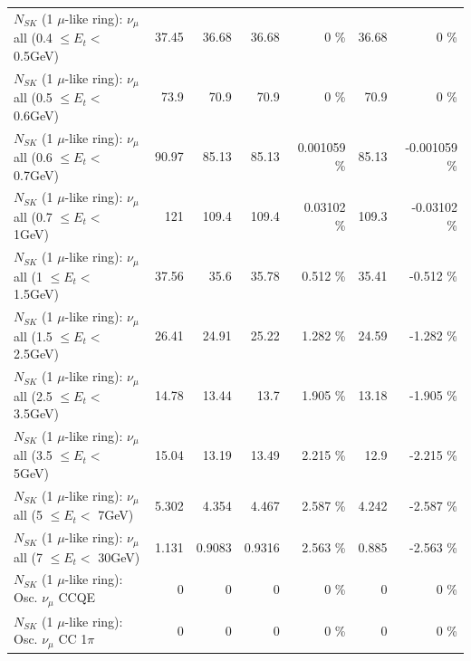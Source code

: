 \begin{table}
\begin{tabular}{| l | r | r | r  r | r  r |}
       $N_{SK}$ (1 $\mu$-like ring): $\nu_{\mu}$ all (0.4 $\leq E_{t} <$ 0.5GeV) &           37.45 &           36.68 &           36.68 &        0 \%  &           36.68 &        0 \%  \\ 
       $N_{SK}$ (1 $\mu$-like ring): $\nu_{\mu}$ all (0.5 $\leq E_{t} <$ 0.6GeV) &            73.9 &            70.9 &            70.9 &        0 \%  &            70.9 &        0 \%  \\ 
       $N_{SK}$ (1 $\mu$-like ring): $\nu_{\mu}$ all (0.6 $\leq E_{t} <$ 0.7GeV) &           90.97 &           85.13 &           85.13 & 0.001059 \%  &           85.13 & -0.001059 \%  \\ 
         $N_{SK}$ (1 $\mu$-like ring): $\nu_{\mu}$ all (0.7 $\leq E_{t} <$ 1GeV) &             121 &           109.4 &           109.4 &  0.03102 \%  &           109.3 & -0.03102 \%  \\ 
         $N_{SK}$ (1 $\mu$-like ring): $\nu_{\mu}$ all (1 $\leq E_{t} <$ 1.5GeV) &           37.56 &            35.6 &           35.78 &    0.512 \%  &           35.41 &   -0.512 \%  \\ 
       $N_{SK}$ (1 $\mu$-like ring): $\nu_{\mu}$ all (1.5 $\leq E_{t} <$ 2.5GeV) &           26.41 &           24.91 &           25.22 &    1.282 \%  &           24.59 &   -1.282 \%  \\ 
       $N_{SK}$ (1 $\mu$-like ring): $\nu_{\mu}$ all (2.5 $\leq E_{t} <$ 3.5GeV) &           14.78 &           13.44 &            13.7 &    1.905 \%  &           13.18 &   -1.905 \%  \\ 
         $N_{SK}$ (1 $\mu$-like ring): $\nu_{\mu}$ all (3.5 $\leq E_{t} <$ 5GeV) &           15.04 &           13.19 &           13.49 &    2.215 \%  &            12.9 &   -2.215 \%  \\ 
           $N_{SK}$ (1 $\mu$-like ring): $\nu_{\mu}$ all (5 $\leq E_{t} <$ 7GeV) &           5.302 &           4.354 &           4.467 &    2.587 \%  &           4.242 &   -2.587 \%  \\ 
          $N_{SK}$ (1 $\mu$-like ring): $\nu_{\mu}$ all (7 $\leq E_{t} <$ 30GeV) &           1.131 &          0.9083 &          0.9316 &    2.563 \%  &           0.885 &   -2.563 \%  \\ 
\hline
\hline
                               $N_{SK}$ (1 $\mu$-like ring): Osc. $\nu_\mu$ CCQE &               0 &               0 &               0 &        0 \%  &               0 &        0 \%  \\ 
                          $N_{SK}$ (1 $\mu$-like ring): Osc. $\nu_\mu$ CC 1$\pi$ &               0 &               0 &               0 &        0 \%  &               0 &        0 \%  \\ 

\end{tabular}
\end{table}
